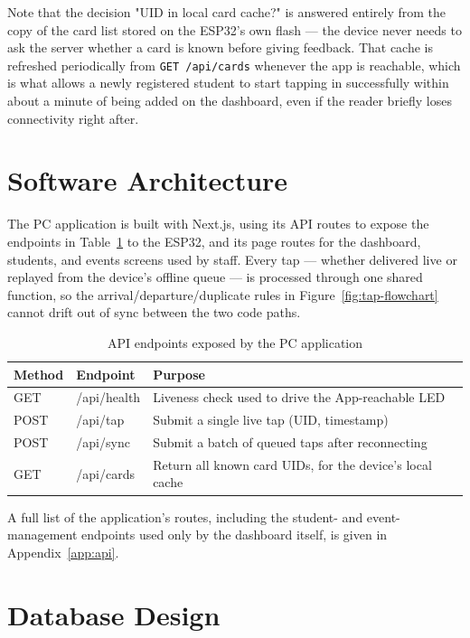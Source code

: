 Note that the decision "UID in local card cache?" is answered entirely from the copy of the card list stored on the ESP32's own flash — the device never needs to ask the server whether a card is known before giving feedback. That cache is refreshed periodically from \texttt{GET /api/cards} whenever the app is reachable, which is what allows a newly registered student to start tapping in successfully within about a minute of being added on the dashboard, even if the reader briefly loses connectivity right after.

\section{Software Architecture}

The PC application is built with Next.js, using its API routes to expose the endpoints in Table~\ref{tab:api-endpoints} to the ESP32, and its page routes for the dashboard, students, and events screens used by staff. Every tap — whether delivered live or replayed from the device's offline queue — is processed through one shared function, so the arrival/departure/duplicate rules in Figure~\ref{fig:tap-flowchart} cannot drift out of sync between the two code paths.

\begin{table}[H]
    \centering
    \caption{API endpoints exposed by the PC application}
    \label{tab:api-endpoints}
    \begin{tabular}{@{}p{2.6cm}p{3.6cm}p{6.5cm}@{}}
        \toprule
        \textbf{Method} & \textbf{Endpoint} & \textbf{Purpose} \\
        \midrule
        GET & /api/health & Liveness check used to drive the App-reachable LED \\
        POST & /api/tap & Submit a single live tap (UID, timestamp) \\
        POST & /api/sync & Submit a batch of queued taps after reconnecting \\
        GET & /api/cards & Return all known card UIDs, for the device's local cache \\
        \bottomrule
    \end{tabular}
\end{table}

A full list of the application's routes, including the student- and event-management endpoints used only by the dashboard itself, is given in Appendix~\ref{app:api}.

\section{Database Design}

